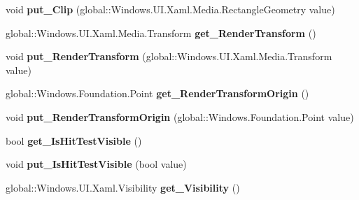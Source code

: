 \begin{DoxyCompactItemize}
void {\bfseries put\+\_\+\+Clip} (global\+::\+Windows.\+U\+I.\+Xaml.\+Media.\+Rectangle\+Geometry value)
\item 
\mbox{\label{interface_windows_1_1_u_i_1_1_xaml_1_1_i_u_i_element_ab552e7826e0d2d6d3c836b38db536820}} 
global\+::\+Windows.\+U\+I.\+Xaml.\+Media.\+Transform {\bfseries get\+\_\+\+Render\+Transform} ()
\item 
\mbox{\label{interface_windows_1_1_u_i_1_1_xaml_1_1_i_u_i_element_ac1ee0a38d70af19ef1629dff46ef59aa}} 
void {\bfseries put\+\_\+\+Render\+Transform} (global\+::\+Windows.\+U\+I.\+Xaml.\+Media.\+Transform value)
\item 
\mbox{\label{interface_windows_1_1_u_i_1_1_xaml_1_1_i_u_i_element_a5fa81294c9c6de8e157213ee727bd1c2}} 
global\+::\+Windows.\+Foundation.\+Point {\bfseries get\+\_\+\+Render\+Transform\+Origin} ()
\item 
\mbox{\label{interface_windows_1_1_u_i_1_1_xaml_1_1_i_u_i_element_a05d8af2ba53053be8810ef8ca2e32f36}} 
void {\bfseries put\+\_\+\+Render\+Transform\+Origin} (global\+::\+Windows.\+Foundation.\+Point value)
\item 
\mbox{\label{interface_windows_1_1_u_i_1_1_xaml_1_1_i_u_i_element_a08d625eccb089821ca78a7845cb5509c}} 
bool {\bfseries get\+\_\+\+Is\+Hit\+Test\+Visible} ()
\item 
\mbox{\label{interface_windows_1_1_u_i_1_1_xaml_1_1_i_u_i_element_aa80fb34be2e9e897b9dc8f558796ab51}} 
void {\bfseries put\+\_\+\+Is\+Hit\+Test\+Visible} (bool value)
\item 
\mbox{\label{interface_windows_1_1_u_i_1_1_xaml_1_1_i_u_i_element_a1d08cd5eebdac6a853903eb22a27b689}} 
global\+::\+Windows.\+U\+I.\+Xaml.\+Visibility {\bfseries get\+\_\+\+Visibility} ()
\item 
\mbox{\label{interface_windows_1_1_u_i_1_1_xaml_1_1_i_u_i_element_aad5d9c40429e519a8d16db9da184a42b}} 

\end{DoxyCompactItemize}
